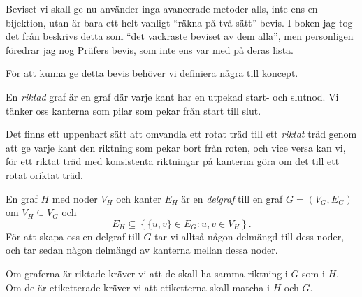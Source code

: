 \documentclass[nobib]{tufte-handout}
\begin{document}
Beviset vi skall ge nu använder inga avancerade metoder alls, inte ens en bijektion, utan är bara ett helt vanligt ``räkna på två sätt''-bevis. I boken jag tog det från
beskrivs detta som ``det vackraste beviset av dem alla'', men personligen föredrar jag nog Prüfers bevis, som inte ens var med på deras lista.

För att kunna ge detta bevis behöver vi definiera några till koncept.

\begin{definition}
    En \emph{riktad} graf är en graf där varje kant har en utpekad start- och slutnod. Vi tänker oss kanterna som pilar som pekar från start till slut.

    Det finns ett uppenbart sätt att omvandla ett rotat träd till ett \emph{riktat} träd genom att ge varje kant den riktning som pekar bort från roten, och vice versa kan vi, för ett riktat träd med konsistenta riktningar på kanterna göra om det till ett rotat oriktat träd.
\end{definition}

\begin{definition}
    En graf $H$ med noder $V_H$ och kanter $E_H$ är en \emph{delgraf} till en graf $G = (V_G, E_G)$ om $V_H\subseteq V_G$ och 
    $$E_H \subseteq \left\{\{u,v\} \in E_G: u, v \in V_H\right\}.$$
    För att skapa oss en delgraf till $G$ tar vi alltså någon delmängd till dess noder, och tar sedan någon delmängd av kanterna mellan dessa noder.

    Om graferna är riktade kräver vi att de skall ha samma riktning i $G$ som i $H$. Om de är etiketterade kräver vi att etiketterna skall matcha i $H$ och $G$.
\end{definition}
\end{document}
